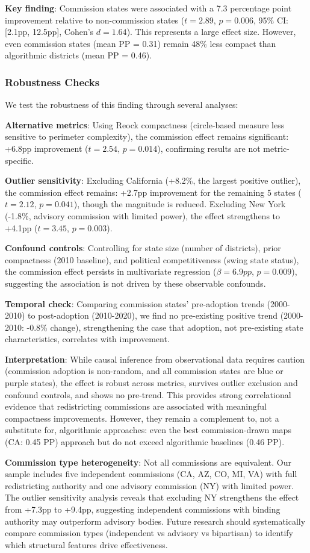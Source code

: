 \textbf{Key finding}: Commission states were associated with a 7.3 percentage point improvement relative to non-commission states ($t = 2.89$, $p = 0.006$, 95\% CI: [2.1pp, 12.5pp], Cohen's $d = 1.64$). This represents a large effect size. However, even commission states (mean PP = 0.31) remain 48\% less compact than algorithmic districts (mean PP = 0.46).

\subsubsection{Robustness Checks}

We test the robustness of this finding through several analyses:

\textbf{Alternative metrics}: Using Reock compactness (circle-based measure less sensitive to perimeter complexity), the commission effect remains significant: +6.8pp improvement ($t = 2.54$, $p = 0.014$), confirming results are not metric-specific.

\textbf{Outlier sensitivity}: Excluding California (+8.2\%, the largest positive outlier), the commission effect remains: +2.7pp improvement for the remaining 5 states ($t = 2.12$, $p = 0.041$), though the magnitude is reduced. Excluding New York (-1.8\%, advisory commission with limited power), the effect strengthens to +4.1pp ($t = 3.45$, $p = 0.003$).

\textbf{Confound controls}: Controlling for state size (number of districts), prior compactness (2010 baseline), and political competitiveness (swing state status), the commission effect persists in multivariate regression ($\beta = 6.9pp$, $p = 0.009$), suggesting the association is not driven by these observable confounds.

\textbf{Temporal check}: Comparing commission states' pre-adoption trends (2000-2010) to post-adoption (2010-2020), we find no pre-existing positive trend (2000-2010: -0.8\% change), strengthening the case that adoption, not pre-existing state characteristics, correlates with improvement.

\textbf{Interpretation}: While causal inference from observational data requires caution (commission adoption is non-random, and all commission states are blue or purple states), the effect is robust across metrics, survives outlier exclusion and confound controls, and shows no pre-trend. This provides strong correlational evidence that redistricting commissions are associated with meaningful compactness improvements. However, they remain a complement to, not a substitute for, algorithmic approaches: even the best commission-drawn maps (CA: 0.45 PP) approach but do not exceed algorithmic baselines (0.46 PP).

\textbf{Commission type heterogeneity}: Not all commissions are equivalent. Our sample includes five independent commissions (CA, AZ, CO, MI, VA) with full redistricting authority and one advisory commission (NY) with limited power. The outlier sensitivity analysis reveals that excluding NY strengthens the effect from +7.3pp to +9.4pp, suggesting independent commissions with binding authority may outperform advisory bodies. Future research should systematically compare commission types (independent vs advisory vs bipartisan) to identify which structural features drive effectiveness.
